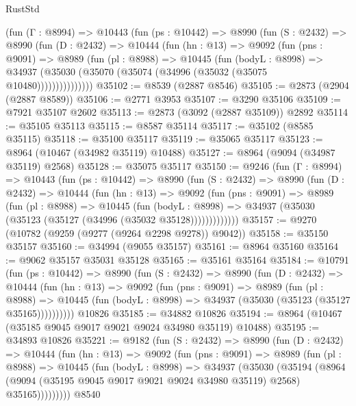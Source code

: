 \begin{lexlean}{RustStd}
\begin{coremodule}
      (fun (Γ : @8994) =>
      @10443
        (fun (ps : @10442) =>
        @8990
          (fun (S : @2432) =>
          @8990
            (fun (D : @2432) =>
            @10444
              (fun (hn : @13) =>
              @9092
                (fun (pns : @9091) =>
                @8989
                  (fun (pl : @8988) =>
                  @10445
                    (fun (bodyL : @8998) =>
                    @34937 (@35030 (@35070 (@35074 (@34996 (@35032 (@35075 @10480)))))))))))))))
@35102 := @8539 (@2887 @8546)
@35105 := @2873 (@2904 (@2887 @8589))
@35106 := @2771 @3953
@35107 := @3290 @35106
@35109 := @7921 @35107 @2602
@35113 := @2873 (@3092 (@2887 @35109)) @2892
@35114 := @35105 @35113
@35115 := @8587 @35114
@35117 := @35102 (@8585 @35115)
@35118 := @35100 @35117
@35119 := @35065 @35117
@35123 := @8964 (@10467 (@34982 @35119) @10488)
@35127 := @8964 (@9094 (@34987 @35119) @2568)
@35128 := @35075 @35117
@35150 := @9246
    (fun (Γ : @8994) =>
    @10443
      (fun (ps : @10442) =>
      @8990
        (fun (S : @2432) =>
        @8990
          (fun (D : @2432) =>
          @10444
            (fun (hn : @13) =>
            @9092
              (fun (pns : @9091) =>
              @8989
                (fun (pl : @8988) =>
                @10445
                  (fun (bodyL : @8998) =>
                  @34937 (@35030 (@35123 (@35127 (@34996 (@35032 @35128)))))))))))))
@35157 := @9270 (@10782 (@9259 (@9277 (@9264 @2298 @9278)) @9042))
@35158 := @35150 @35157
@35160 := @34994 (@9055 @35157)
@35161 := @8964 @35160
@35164 := @9062 @35157 @35031 @35128
@35165 := @35161 @35164
@35184 := @10791
    (fun (ps : @10442) =>
    @8990
      (fun (S : @2432) =>
      @8990
        (fun (D : @2432) =>
        @10444
          (fun (hn : @13) =>
          @9092
            (fun (pns : @9091) =>
            @8989
              (fun (pl : @8988) =>
              @10445 (fun (bodyL : @8998) => @34937 (@35030 (@35123 (@35127 @35165))))))))))
    @10826
@35185 := @34882 @10826
@35194 := @8964 (@10467 (@35185 @9045 @9017 @9021 @9024 @34980 @35119) @10488)
@35195 := @34893 @10826
@35221 := @9182
    (fun (S : @2432) =>
    @8990
      (fun (D : @2432) =>
      @10444
        (fun (hn : @13) =>
        @9092
          (fun (pns : @9091) =>
          @8989
            (fun (pl : @8988) =>
            @10445
              (fun (bodyL : @8998) =>
              @34937
                (@35030
                  (@35194
                    (@8964
                      (@9094 (@35195 @9045 @9017 @9021 @9024 @34980 @35119) @2568)
                      @35165)))))))))
    @8540

\end{coremodule}
\end{lexlean}
